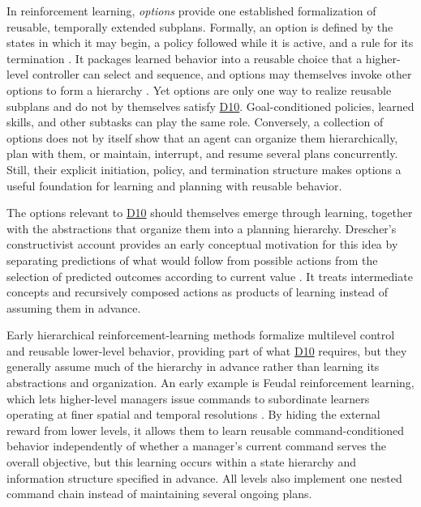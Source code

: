 \documentclass[10pt,journal,compsoc]{IEEEtran}
\DeclareRobustCommand{\Dref}[1]{\hyperref[sec:d#1]{D#1}}
\begin{document}
In reinforcement learning, \emph{options} provide one established formalization of reusable, temporally extended subplans.
Formally, an option is defined by the states in which it may begin, a policy followed while it is active, and a rule for its termination \cite{sutton1999}.
It packages learned behavior into a reusable choice that a higher-level controller can select and sequence, and options may themselves invoke other options to form a hierarchy \cite{barto2003}.
Yet options are only one way to realize reusable subplans and do not by themselves satisfy \Dref{10}.
Goal-conditioned policies, learned skills, and other subtasks can play the same role.
Conversely, a collection of options does not by itself show that an agent can organize them hierarchically, plan with them, or maintain, interrupt, and resume several plans concurrently.
Still, their explicit initiation, policy, and termination structure makes options a useful foundation for learning and planning with reusable behavior.

The options relevant to \Dref{10} should themselves emerge through learning, together with the abstractions that organize them into a planning hierarchy.
Drescher's constructivist account provides an early conceptual motivation for this idea by separating predictions of what would follow from possible actions from the selection of predicted outcomes according to current value \cite{drescher1991}.
It treats intermediate concepts and recursively composed actions as products of learning instead of assuming them in advance.

Early hierarchical reinforcement-learning methods formalize multilevel control and reusable lower-level behavior, providing part of what \Dref{10} requires, but they generally assume much of the hierarchy in advance rather than learning its abstractions and organization.
An early example is Feudal reinforcement learning, which lets higher-level managers issue commands to subordinate learners operating at finer spatial and temporal resolutions \cite{dayan1993a}.
By hiding the external reward from lower levels, it allows them to learn reusable command-conditioned behavior independently of whether a manager's current command serves the overall objective, but this learning occurs within a state hierarchy and information structure specified in advance.
All levels also implement one nested command chain instead of maintaining several ongoing plans.
\end{document}
